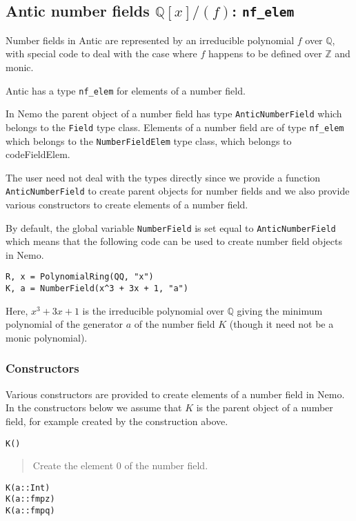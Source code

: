 \documentclass[a4paper,10pt]{article}
\newcommand{\Z}{\mathbb{Z}}
\newcommand{\Q}{\mathbb{Q}}
\newcommand{\code}{\lstinline}
\newcommand{\desc}[1]{\vspace{-3mm}\begin{quote}#1\end{quote}}
\begin{document}
{{\subsection{Antic number fields $\Q[x]/(f)$: \code|nf_elem|}

Number fields in Antic are represented by an irreducible polynomial $f$ over $\Q$,
with special code to deal with the case where $f$ happens to be defined over $\Z$
and monic.

Antic has a type \code{nf_elem} for elements of a number field.

In Nemo the parent object of a number field has type \code{AnticNumberField} which
belongs to the \code{Field} type class. Elements of a number field are of type
\code{nf_elem} which belongs to the \code{NumberFieldElem} type class, which belongs
to code{FieldElem}.

The user need not deal with the types directly since we provide a function
\code{AnticNumberField} to create parent objects for number fields and we also
provide various constructors to create elements of a number field.

By default, the global variable \code{NumberField} is set equal to
\code{AnticNumberField} which means that the following code can be used to
create number field objects in Nemo.

\begin{lstlisting}
R, x = PolynomialRing(QQ, "x")
K, a = NumberField(x^3 + 3x + 1, "a")
\end{lstlisting}

Here, $x^3 + 3x + 1$ is the irreducible polynomial over $\Q$ giving the minimum
polynomial of the generator $a$ of the number field $K$ (though it need not be
a monic polynomial).

\subsubsection{Constructors}

Various constructors are provided to create elements of a number field in Nemo.
In the constructors below we assume that $K$ is the parent object of a number field,
for example created by the construction above.

\begin{lstlisting}
K()
\end{lstlisting}

\desc{Create the element $0$ of the number field.}

\begin{lstlisting}
K(a::Int)
K(a::fmpz)
K(a::fmpq)
\end{lstlisting}

}}
\end{document}
